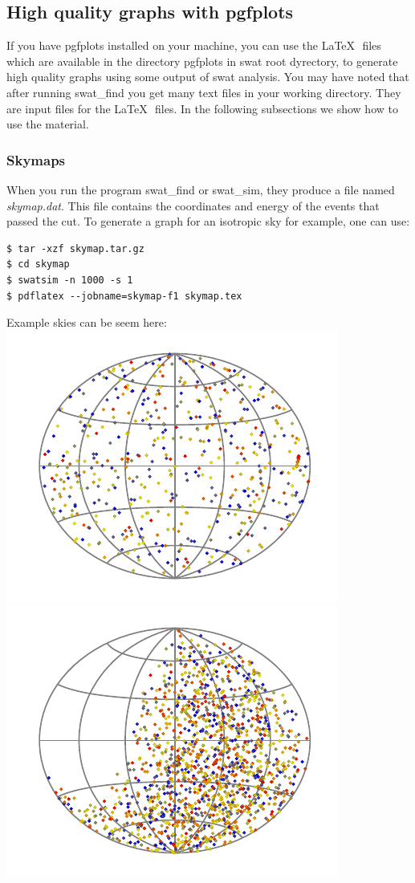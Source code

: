 \documentclass[12pt]{article}
\begin{document}
\subsection{High quality graphs with pgfplots} \label{ch::pgfplots}
If you have pgfplots installed on your machine, you can use the \LaTeX\,\,
files which are available in the directory {\color{textcolor}pgfplots} in swat
root dyrectory, to generate high quality graphs using some output of swat
analysis.  You may have noted that after running {\color{textcolor}swat\_find}
you get many text files in your working directory. They are input files for the
\LaTeX\,\, files. In the following subsections we show how to use the material.
\subsubsection{Skymaps}
When you run the program {\color{textcolor}swat\_find} or {\color{textcolor}swat\_sim}, they produce a file named
{\it skymap.dat}. This file contains the coordinates and energy of the events that
passed the cut. To generate a graph for an isotropic sky for example, one can
use:
{\bf \color{textcolor}
\begin{lstlisting}
$ tar -xzf skymap.tar.gz
$ cd skymap
$ swatsim -n 1000 -s 1
$ pdflatex --jobname=skymap-f1 skymap.tex
\end{lstlisting}
}
Example skies can be seem here:\\
\includegraphics[scale=1.0]{skymap-sim.pdf} 
\includegraphics[scale=1.0]{skymap.pdf}
\end{document}
